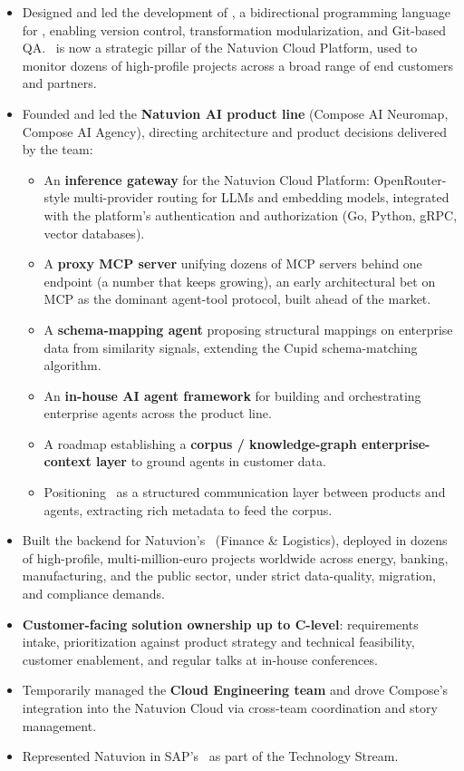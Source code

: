 \documentclass[noindent]{scrartcl}
\begin{document}
\begin{cv}{}
{\begin{itemize}[label=\isym]
    \item Designed and led the development of \compose, a bidirectional programming language for \migrate, enabling version control, transformation modularization, and Git-based QA.
          \compose\ is now a strategic pillar of the Natuvion Cloud Platform, used to monitor dozens of high-profile projects across a broad range of end customers and partners.
    \item Founded and led the \textbf{Natuvion AI product line} (Compose AI Neuromap, Compose AI Agency), directing architecture and product decisions delivered by the team:
    \begin{itemize}[label=\cdot]
        \item An \textbf{inference gateway} for the Natuvion Cloud Platform: OpenRouter-style multi-provider routing for LLMs and embedding models, 
               integrated with the platform's authentication and authorization (Go, Python, gRPC, vector databases).
        \item A \textbf{proxy MCP server} unifying dozens of MCP servers behind one endpoint (a number that keeps growing), an early architectural bet on MCP as the dominant agent-tool protocol, built ahead of the market.
        \item A \textbf{schema-mapping agent} proposing structural mappings on enterprise data from similarity signals, extending the Cupid schema-matching algorithm.
        \item An \textbf{in-house AI agent framework} for building and orchestrating enterprise agents across the product line.
        \item A roadmap establishing a \textbf{corpus / knowledge-graph enterprise-context layer} to ground agents in customer data.
        \item Positioning \compose\ as a structured communication layer between products and agents, extracting rich metadata to feed the corpus.
    \end{itemize}
    \item Built the backend for Natuvion’s \transformation\ (Finance \& Logistics), deployed in dozens of high-profile, multi-million-euro projects worldwide across energy, banking, manufacturing, and the public sector, under strict data-quality, migration, and compliance demands.
    \item \textbf{Customer-facing solution ownership up to C-level}: requirements intake, prioritization against product strategy and technical feasibility, customer enablement, and regular talks at in-house conferences.
    \item Temporarily managed the \textbf{Cloud Engineering team} and drove Compose’s integration into the Natuvion Cloud via cross-team coordination and story management.
    \item Represented Natuvion in SAP’s \sdte\ as part of the Technology Stream.
\end{itemize}
}


\end{cv}
\end{document}
